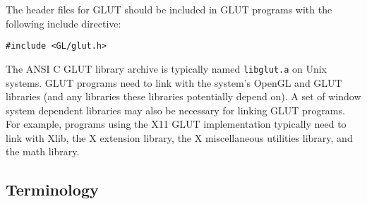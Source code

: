 The header files for GLUT should be included in GLUT programs
with the following include directive:
\begin{verbatim}
#include <GL/glut.h>
\end{verbatim}

The ANSI C GLUT library archive is typically named {\tt libglut.a} on Unix
systems.  GLUT programs need to link with the system's OpenGL and GLUT libraries
(and any libraries these libraries potentially depend on).
A set of window system dependent libraries may also be necessary
for linking GLUT programs.  For example, programs using the X11 GLUT
implementation typically need to link with Xlib, the X extension
library, the X miscellaneous utilities library, and the math library.

\subsection{Terminology}

